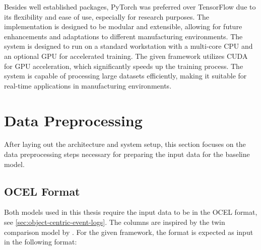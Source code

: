 Besides well established packages, PyTorch was preferred over TensorFlow due to its flexibility and ease of use, especially for research purposes. The implementation is designed to be modular and extensible, allowing for future enhancements and adaptations to different manufacturing environments.
The system is designed to run on a standard workstation with a multi-core CPU and an optional GPU for accelerated training. The given framework utilizes CUDA \autocite{NVIDIA_CUDA} for GPU acceleration, which significantly speeds up the training process. The system is capable of processing large datasets efficiently, making it suitable for real-time applications in manufacturing environments.


\section{Data Preprocessing}
\label{sec:event_log_processing}

After laying out the architecture and system setup, this section focuses on the data preprocessing steps necessary for preparing the input data for the baseline model.

\subsection{OCEL Format}

Both models used in this thesis require the input data to be in the OCEL format, see \autoref{sec:object-centric-event-logs}. The columns are inspired by the twin comparison model by \autocite{schwede2024learning}. For the given framework, the format is expected as input in the following format:

